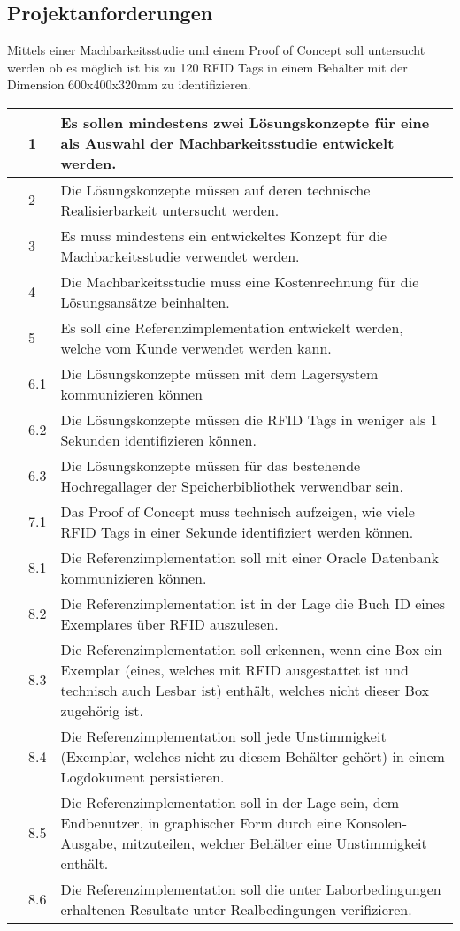 \subsection{Projektanforderungen}
Mittels einer Machbarkeitsstudie und einem Proof of Concept soll untersucht werden ob es möglich ist bis zu 120 \gls{RFID} Tags in einem Behälter mit der Dimension 600x400x320mm zu identifizieren.


\begin{tabularx}{\textwidth}{l l X}
	\hline
	\checkmark & 1   & Es sollen mindestens zwei Lösungskonzepte für eine als Auswahl der Machbarkeitsstudie entwickelt werden. \\
	\hline
	\checkmark & 2   & Die Lösungskonzepte müssen auf deren technische Realisierbarkeit untersucht werden. \\
	\hline
	\checkmark & 3   & Es muss mindestens ein entwickeltes Konzept für die Machbarkeitsstudie verwendet werden. \\
	\hline
	\checkmark & 4   & Die Machbarkeitsstudie muss eine Kostenrechnung für die Lösungsansätze beinhalten. \\
	\hline
	\checkmark & 5   & Es soll eine Referenzimplementation entwickelt werden, welche vom Kunde verwendet werden kann. \\
	\hline
	\checkmark & 6.1 & Die Lösungskonzepte müssen mit dem Lagersystem kommunizieren können \\
	\hline
	\checkmark & 6.2 & Die Lösungskonzepte müssen die RFID Tags in weniger als 1 Sekunden identifizieren können. \\
	\hline
	\checkmark & 6.3 & Die Lösungskonzepte müssen für das bestehende Hochregallager der Speicherbibliothek verwendbar sein. \\
	\hline
	\checkmark & 7.1 & Das Proof of Concept muss technisch aufzeigen, wie viele RFID Tags in einer Sekunde identifiziert werden können. \\
	\hline
	\checkmark & 8.1 & Die Referenzimplementation soll mit einer Oracle Datenbank kommunizieren können. \\
	\hline
	\checkmark & 8.2 & Die Referenzimplementation ist in der Lage die Buch ID eines Exemplares über RFID auszulesen. \\
	\hline
	\checkmark & 8.3 & Die Referenzimplementation soll erkennen, wenn eine Box ein Exemplar (eines, welches mit RFID ausgestattet ist und technisch auch Lesbar ist) enthält, welches nicht dieser Box zugehörig ist. \\
	\hline
	\checkmark & 8.4 & Die Referenzimplementation soll jede Unstimmigkeit (Exemplar, welches nicht zu diesem Behälter gehört) in einem Logdokument persistieren. \\
	\hline
	\checkmark & 8.5 & Die Referenzimplementation soll in der Lage sein, dem Endbenutzer, in graphischer Form durch eine Konsolen-Ausgabe, mitzuteilen, welcher Behälter eine Unstimmigkeit enthält. \\
	\hline
	\checkmark & 8.6 & Die Referenzimplementation soll die unter Laborbedingungen erhaltenen Resultate unter Realbedingungen verifizieren. \\
	\hline
\end{tabularx}


